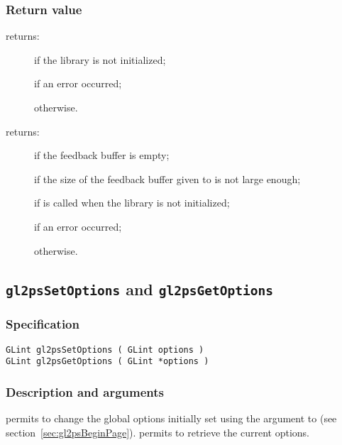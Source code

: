 \subsubsection{Return value}

\noindent{} returns:
\begin{description}
\item[] if the library is not initialized;
\item[] if an error occurred;
\item[] otherwise.
\end{description}

\noindent{} returns:
\begin{description}
\item[] if the feedback buffer is empty;
\item[] if the size of the feedback buffer given to
   is not large enough;
\item[] if  is called when the
  library is not initialized;
\item[] if an error occurred;
\item[] otherwise.
\end{description}


\subsection{\texttt{gl2psSetOptions} and \texttt{gl2psGetOptions}}
\label{sec:gl2psSetOptions}

\subsubsection{Specification}

\begin{verbatim}
GLint gl2psSetOptions ( GLint options )
GLint gl2psGetOptions ( GLint *options )
\end{verbatim}

\subsubsection{Description and arguments}

 permits to change the global options initially
set using the  argument to  (see
section~\ref{sec:gl2psBeginPage}).  permits to
retrieve the current options.

